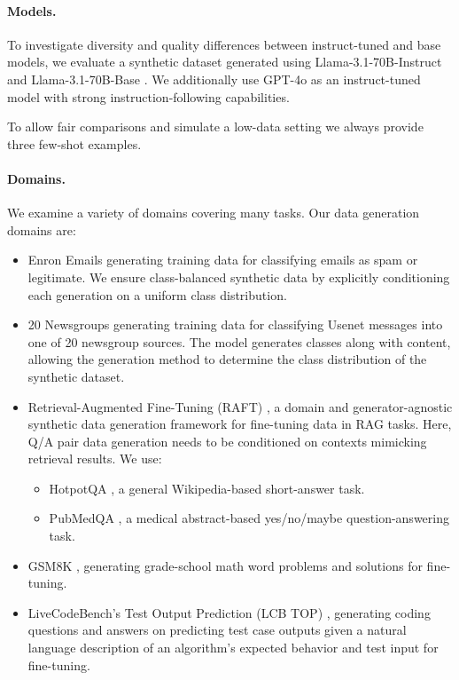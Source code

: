 \paragraph{Models.} To investigate diversity and quality differences between instruct-tuned and base models, we evaluate a synthetic dataset generated using Llama-3.1-70B-Instruct and Llama-3.1-70B-Base \cite{llama2024llama}. We additionally use GPT-4o \cite{openai2024hello} as an instruct-tuned model with strong instruction-following capabilities.

To allow fair comparisons and simulate a low-data setting we always provide three few-shot examples.

\paragraph{Domains.}
\label{sec:domains}

We examine a variety of domains covering many tasks. Our data generation domains are:
\begin{itemize}
    \setlength\itemsep{0em}
    \item Enron Emails \cite{Klimt2004} generating training data for classifying emails as spam or legitimate. We ensure class-balanced synthetic data by explicitly conditioning each generation on a uniform class distribution.
    \item 20 Newsgroups \cite{scikit-learn} generating training data for classifying Usenet messages into one of 20 newsgroup sources. The model generates classes along with content, allowing the generation method to determine the class distribution of the synthetic dataset.
    \item Retrieval-Augmented Fine-Tuning (RAFT) \cite{zhang2024raftadaptinglanguagemodel}, a domain and generator-agnostic synthetic data generation framework for fine-tuning data in RAG tasks. Here, Q/A pair data generation needs to be conditioned on contexts mimicking retrieval results. We use:
    \begin{itemize}
        \item HotpotQA \cite{yang2018hotpotqadatasetdiverseexplainable}, a general Wikipedia-based short-answer task.
        \item PubMedQA \cite{jin2019pubmedqadatasetbiomedicalresearch}, a medical abstract-based yes/no/maybe question-answering task.
    \end{itemize}
    \item GSM8K \cite{cobbe2021trainingverifierssolvemath}, generating grade-school math word problems and solutions for fine-tuning.
    \item LiveCodeBench's Test Output Prediction (LCB TOP) \cite{jain2024livecodebenchholisticcontaminationfree}, generating coding questions and answers on predicting test case outputs given a natural language description of an algorithm's expected behavior and test input for fine-tuning.
\end{itemize}

